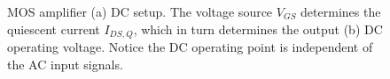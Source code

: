 \begin{figure}[t]
\centering
{}
\caption{MOS amplifier (a) DC setup.  The voltage source $V_{GS}$ determines the quiescent current $I_{DS,Q}$, which in turn determines the output (b) DC operating voltage.  Notice the DC operating point is independent of the AC input signals.} 
\end{figure}
